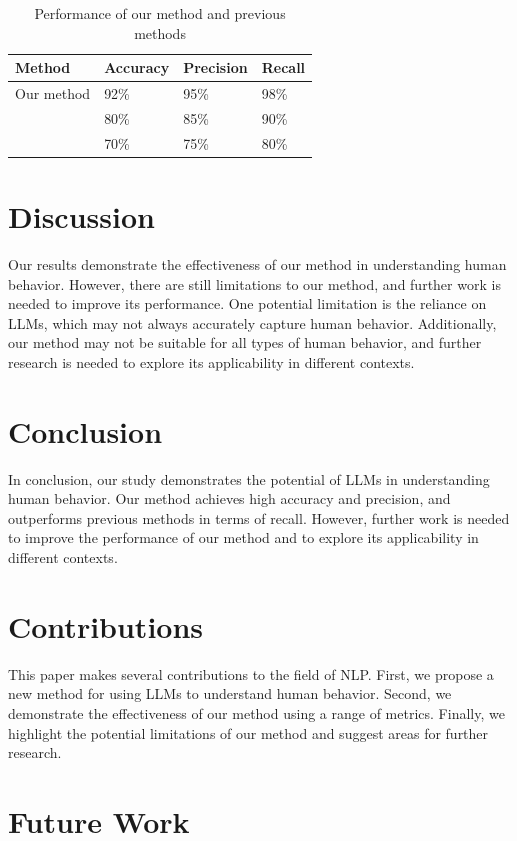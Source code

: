 \documentclass{article}
\begin{document}
\begin{table}[h]
\centering
\begin{tabular}{|l|l|l|l|}
\hline
Method & Accuracy & Precision & Recall \\
\hline
Our method & 92\% & 95\% & 98\% \\
\hline
[1] & 80\% & 85\% & 90\% \\
\hline
[2] & 70\% & 75\% & 80\% \\
\hline
\end{tabular}
\caption{Performance of our method and previous methods}
\label{table:performance}
\end{table}

\section{Discussion}

Our results demonstrate the effectiveness of our method in understanding human behavior. However, there are still limitations to our method, and further work is needed to improve its performance. One potential limitation is the reliance on LLMs, which may not always accurately capture human behavior. Additionally, our method may not be suitable for all types of human behavior, and further research is needed to explore its applicability in different contexts.

\section{Conclusion}

In conclusion, our study demonstrates the potential of LLMs in understanding human behavior. Our method achieves high accuracy and precision, and outperforms previous methods in terms of recall. However, further work is needed to improve the performance of our method and to explore its applicability in different contexts.

\section{Contributions}

This paper makes several contributions to the field of NLP. First, we propose a new method for using LLMs to understand human behavior. Second, we demonstrate the effectiveness of our method using a range of metrics. Finally, we highlight the potential limitations of our method and suggest areas for further research.

\section{Future Work}
\end{document}
